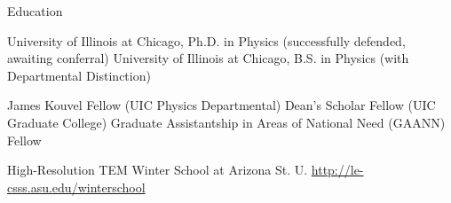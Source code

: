 \begin{rubric}{Education}


  \entry*[2005 --- 2013] University of Illinois at Chicago, Ph.D. in Physics (successfully defended, awaiting conferral)
  \entry*[2002 --- 2005] University of Illinois at Chicago, B.S. in Physics (with Departmental Distinction)
  

  \entry*[2011 --- 2012] James Kouvel Fellow (UIC Physics Departmental)
  \entry*[2011 --- 2012] Dean's Scholar Fellow (UIC Graduate College)
  \entry*[2007 --- 2010] Graduate Assistantship in Areas of National Need (GAANN) Fellow


  \entry*[Jan 2009] High-Resolution TEM Winter School at Arizona St. U. \url{http://le-csss.asu.edu/winterschool}
\end{rubric}
